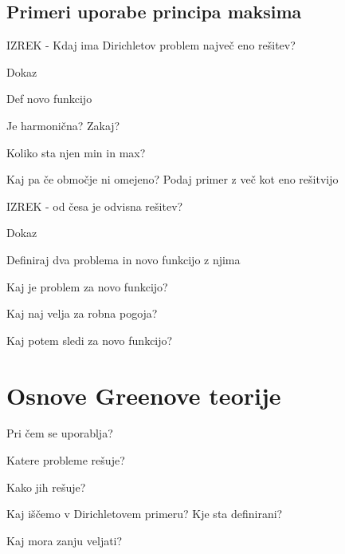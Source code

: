 \documentclass{article}
\begin{document}
    \subsection{Primeri uporabe principa maksima}
    \begin{enumerate}
        {\color{red}\item IZREK - Kdaj ima Dirichletov problem največ eno rešitev?}
        \item Dokaz
        \begin{itemize}
            {\color{red}\item Def novo funkcijo}
            \item Je harmonična? Zakaj?
            {\color{red}\item Koliko sta njen min in max?}
        \end{itemize}
        {\color{red}\item Kaj pa če območje ni omejeno? Podaj primer z več kot eno rešitvijo}
        \item IZREK - od česa je odvisna rešitev?
        \item Dokaz
        \begin{itemize}
            {\color{red}\item Definiraj dva problema in novo funkcijo z njima}
            \item Kaj je problem za novo funkcijo?
            {\color{red}\item Kaj naj velja za robna pogoja?}
            {\color{red}\item Kaj potem sledi za novo funkcijo?}
        \end{itemize}
    \end{enumerate}

    \section{Osnove Greenove teorije}
    \begin{enumerate}
        \item Pri čem se uporablja?
        {\color{red}\item Katere probleme rešuje?}
        {\color{red}\item Kako jih rešuje?}
        {\color{red}\item Kaj iščemo v Dirichletovem primeru? Kje sta definirani?}
        {\color{red}\item Kaj mora zanju veljati?}
    \end{enumerate}
\end{document}
